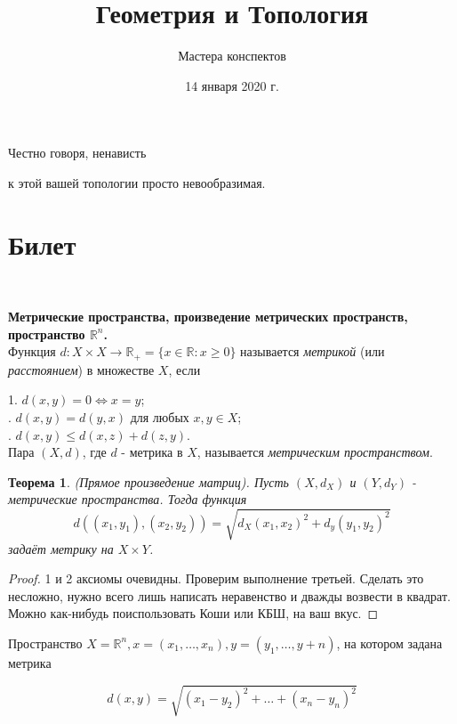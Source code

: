 \documentclass[a4paper,100pt]{article}
\title{Геометрия и Топология}
\author{Мастера конспектов}
\date{14 января 2020 г.}
\theoremstyle{indented}
\newtheorem{theorem}{Теорема}
\begin{document}
\maketitle 

\newpage

\hypertarget{t1}{Честно говоря, ненависть} к этой вашей топологии просто невообразимая.
\tableofcontents

\newpage

\section{Билет} \

\medskip

\textbf{Метрические пространства, произведение метрических пространств, пространство $\mathbb{R}^n$.} \\

Функция $d: X \times X \rightarrow \mathbb{R}_+ = \{x \in \mathbb{R} : x\geq 0\}$ называется \hypertarget{n1}{\textit{метрикой}} (или \textit{расстоянием}) 
в множестве $X$, если \

\medskip

1. $d(x, y)=0 \Leftrightarrow x=y$; \\
. $d(x, y)= d(y, x)$ для любых $x, y \in X$; \\
. $d(x, y)\leq d(x, z)+d(z, y)$. \\

Пара $(X, d)$, где $d$ - метрика в $X$, называется \hypertarget{n2}{\textit{метрическим пространством}}. \\

\begin{theorem}
(Прямое произведение матриц). Пусть $(X, d_X)$ и $(Y, d_Y)$ - метрические пространства. Тогда функция
\[
    d((x_1, y_1), (x_2, y_2))=\sqrt{d_X(x_1, x_2)^2+d_y(y_1, y_2)^2}
\]
задаёт метрику на $X\times Y$.
\end{theorem}

\begin{proof}
1 и 2 аксиомы очевидны. Проверим выполнение третьей. Сделать это несложно, нужно всего лишь написать неравенство и дважды возвести в квадрат. Можно как-нибудь поиспользовать Коши или КБШ, на ваш вкус.
\end{proof}

\medskip

Пространство $X=\mathbb{R}^n, x=(x_1, \dots, x_n), y=(y_1, \dots, y+n)$, на котором задана метрика

\[
    d(x, y)=\sqrt{(x_1-y_2)^2+\dots+(x_n-y_n)^2}
\]
\end{document}
